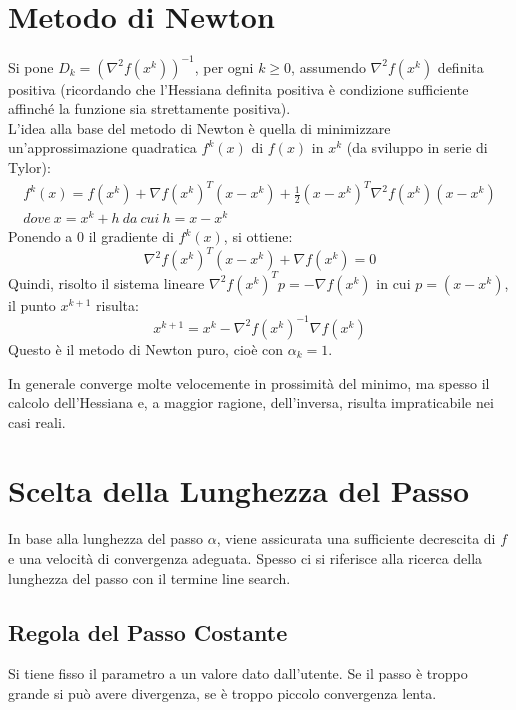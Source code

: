 \documentclass{report}
\begin{document}
\section{Metodo di Newton}
Si pone $D_k = (\nabla^2 f(x^k))^{-1}$, per ogni $k \geqslant 0$, assumendo $\nabla^2 f(x^k)$ definita positiva (ricordando che l'Hessiana definita positiva è condizione sufficiente affinché la funzione sia strettamente positiva).\\
L'idea alla base del metodo di Newton è quella di minimizzare un'approssimazione quadratica $f^k(x)$ di $f(x)$ in $x^k$ (da sviluppo in serie di Tylor):
\begin{equation}
    \label{Newton1}
    \begin{gathered}
     f^k(x) = f(x^k) + \nabla f(x^k)^T (x-x^k) + \frac{1}{2} (x-x^k)^T \nabla^2 f(x^k) (x - x^k)\\
     dove\ x = x^k + h\ da\ cui\ h=x-x^k
    \end{gathered}
\end{equation}
Ponendo a 0 il gradiente di $f^k(x)$, si ottiene:
\begin{equation}
    \label{Newton2}
    \nabla^2f(x^k)^T(x-x^k) + \nabla f(x^k) = 0
\end{equation}
Quindi, risolto il sistema lineare $\nabla^2f(x^k)^Tp = - \nabla f(x^k)$ in cui $p=(x-x^k)$, il punto $x^{k+1}$ risulta:
\begin{equation}
    \label{Newton3}
    x^{k+1} = x^k -\nabla^2f(x^k)^{-1} \nabla f(x^k)
\end{equation}
Questo è il metodo di Newton puro, cioè con $\alpha_k = 1$.

In generale converge molte velocemente in prossimità del minimo, ma spesso il calcolo dell'Hessiana e, a maggior ragione, dell'inversa, risulta impraticabile nei casi reali.

\section{Scelta della Lunghezza del Passo}
In base alla lunghezza del passo $\alpha$, viene assicurata una sufficiente decrescita di $f$ e una velocità di convergenza adeguata. Spesso ci si riferisce alla ricerca della lunghezza del passo con il termine line search.

\subsection{Regola del Passo Costante}
Si tiene fisso il parametro a un valore dato dall'utente. Se il passo è troppo grande si può avere divergenza, se è troppo piccolo convergenza lenta.
\end{document}
